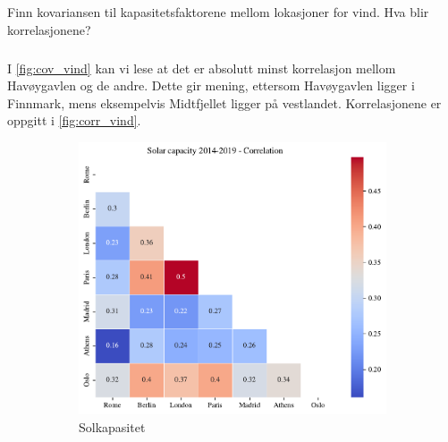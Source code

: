 \documentclass{article}
\begin{document}
\subsection{}
Finn kovariansen til kapasitetsfaktorene mellom lokasjoner for vind. Hva blir korrelasjonene?

\subsubsection{}
I \autoref{fig:cov_vind} kan vi lese at det er absolutt minst korrelasjon mellom Havøygavlen og de andre.
Dette gir mening, ettersom Havøygavlen ligger i Finnmark, mens eksempelvis Midtfjellet ligger på vestlandet.
Korrelasjonene er oppgitt i \autoref{fig:corr_vind}.

\begin{figure}[h]
\centering
\begin{subfigure}{.5\textwidth}
    \centering
    \includegraphics[width=\linewidth]{oblig/figures/Solar/Solar capacity 2014-2019 - Correlation.pdf}
    \caption{Solkapasitet}
    \label{fig:corr_sol}
\end{subfigure}%
\begin{subfigure}{.5\textwidth}
    \centering

\end{subfigure}
\end{figure}
\end{document}
